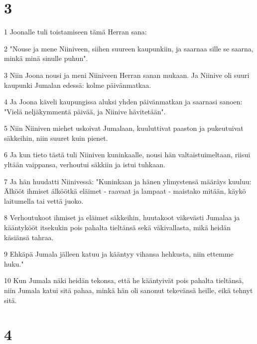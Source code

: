 \chapter{3}

\par 1 Joonalle tuli toistamiseen tämä Herran sana:
\par 2 "Nouse ja mene Niiniveen, siihen suureen kaupunkiin, ja saarnaa sille se saarna, minkä minä sinulle puhun".
\par 3 Niin Joona nousi ja meni Niiniveen Herran sanan mukaan. Ja Niinive oli suuri kaupunki Jumalan edessä: kolme päivänmatkaa.
\par 4 Ja Joona käveli kaupungissa aluksi yhden päivänmatkan ja saarnasi sanoen: "Vielä neljäkymmentä päivää, ja Niinive hävitetään".
\par 5 Niin Niiniven miehet uskoivat Jumalaan, kuuluttivat paaston ja pukeutuivat säkkeihin, niin suuret kuin pienet.
\par 6 Ja kun tieto tästä tuli Niiniven kuninkaalle, nousi hän valtaistuimeltaan, riisui yltään vaippansa, verhoutui säkkiin ja istui tuhkaan.
\par 7 Ja hän huudatti Niinivessä: "Kuninkaan ja hänen ylimystensä määräys kuuluu: Älkööt ihmiset älköötkä eläimet - raavaat ja lampaat - maistako mitään, käykö laitumella tai vettä juoko.
\par 8 Verhoutukoot ihmiset ja eläimet säkkeihin, huutakoot väkevästi Jumalaa ja kääntykööt itsekukin pois pahalta tieltänsä sekä väkivallasta, mikä heidän käsiänsä tahraa.
\par 9 Ehkäpä Jumala jälleen katuu ja kääntyy vihansa hehkusta, niin ettemme huku."
\par 10 Kun Jumala näki heidän tekonsa, että he kääntyivät pois pahalta tieltänsä, niin Jumala katui sitä pahaa, minkä hän oli sanonut tekevänsä heille, eikä tehnyt sitä.

\chapter{4}

